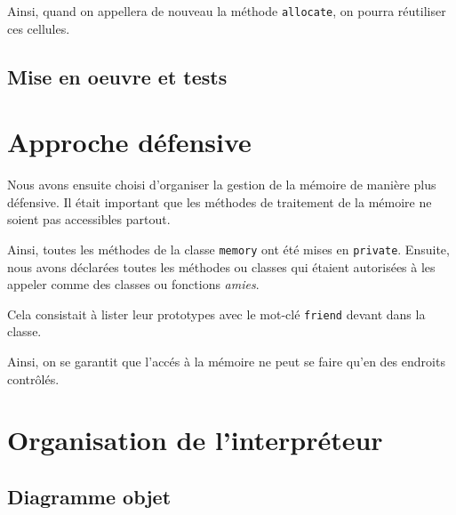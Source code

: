 \documentclass[12pt]{article}
\def\code #1{\lstinline{#1}}
\begin{document}
Ainsi, quand on appellera de nouveau la méthode \code{allocate}, on pourra réutiliser ces cellules.


\subsection{Mise en oeuvre et tests}

\section{Approche défensive}

Nous avons ensuite choisi d'organiser la gestion de la mémoire de manière plus défensive. Il était important que les méthodes de traitement de la mémoire ne soient pas accessibles partout.

Ainsi, toutes les méthodes de la classe \code{memory} ont été mises en \code{private}. Ensuite, nous avons déclarées toutes les méthodes ou classes qui étaient autorisées à les appeler comme des classes ou fonctions \emph{amies}.

Cela consistait à lister leur prototypes avec le mot-clé \code{friend} devant dans la classe.

Ainsi, on se garantit que l'accés à la mémoire ne peut se faire qu'en des endroits contrôlés.


\section{Organisation de l'interpréteur}

\subsection{Diagramme objet}
\end{document}
